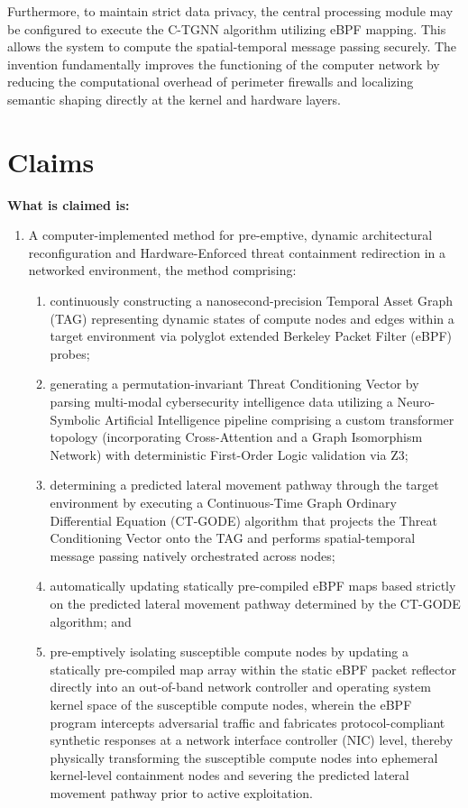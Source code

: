 \documentclass[12pt, letterpaper]{article}
\begin{document}
Furthermore, to maintain strict data privacy, the central processing module may be configured to execute the C-TGNN algorithm utilizing eBPF mapping. This allows the system to compute the spatial-temporal message passing securely. The invention fundamentally improves the functioning of the computer network by reducing the computational overhead of perimeter firewalls and localizing semantic shaping directly at the kernel and hardware layers.

\pagebreak
\section*{Claims}
\noindent \textbf{What is claimed is:}
\begin{enumerate}[label=\textbf{\arabic*.}, leftmargin=*]
    
    \item A computer-implemented method for pre-emptive, dynamic architectural reconfiguration and Hardware-Enforced threat containment redirection in a networked environment, the method comprising:
    \begin{enumerate}[label=(\alph*)]
        \item continuously constructing a nanosecond-precision Temporal Asset Graph (TAG) representing dynamic states of compute nodes and edges within a target environment via polyglot extended Berkeley Packet Filter (eBPF) probes;
        \item generating a permutation-invariant Threat Conditioning Vector by parsing multi-modal cybersecurity intelligence data utilizing a Neuro-Symbolic Artificial Intelligence pipeline comprising a custom transformer topology (incorporating Cross-Attention and a Graph Isomorphism Network) with deterministic First-Order Logic validation via Z3;
        \item determining a predicted lateral movement pathway through the target environment by executing a Continuous-Time Graph Ordinary Differential Equation (CT-GODE) algorithm that projects the Threat Conditioning Vector onto the TAG and performs spatial-temporal message passing natively orchestrated across nodes;
        \item automatically updating statically pre-compiled eBPF maps based strictly on the predicted lateral movement pathway determined by the CT-GODE algorithm; and
        \item pre-emptively isolating susceptible compute nodes by updating a statically pre-compiled map array within the static eBPF packet reflector directly into an out-of-band network controller and operating system kernel space of the susceptible compute nodes, wherein the eBPF program intercepts adversarial traffic and fabricates protocol-compliant synthetic responses at a network interface controller (NIC) level, thereby physically transforming the susceptible compute nodes into ephemeral kernel-level containment nodes and severing the predicted lateral movement pathway prior to active exploitation.
    \end{enumerate}


\end{enumerate}
\end{document}
